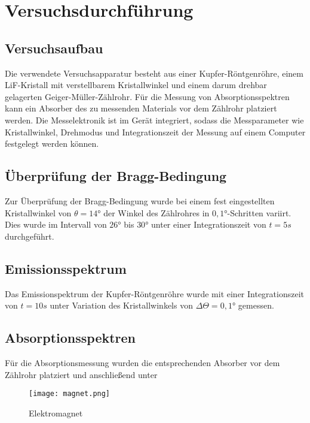 \section{Versuchsdurchführung}
\subsection{Versuchsaufbau}
Die verwendete Versuchsapparatur besteht aus einer Kupfer-Röntgenröhre, einem LiF-Kristall mit verstellbarem Kristallwinkel und einem darum drehbar gelagerten Geiger-Müller-Zählrohr. Für die Messung von Absorptionsspektren kann ein Absorber des zu messenden Materials vor dem Zählrohr platziert werden. Die Messelektronik ist im Gerät integriert, sodass die Messparameter wie Kristallwinkel, Drehmodus und Integrationszeit der Messung auf einem Computer festgelegt werden können.
\subsection{Überprüfung der Bragg-Bedingung}
Zur Überprüfung der Bragg-Bedingung wurde bei einem fest eingestellten Kristallwinkel von $\theta=14°$ der Winkel des Zählrohres in $0,1°$-Schritten variirt. Dies wurde im Intervall von $26°$ bis $30°$ unter einer Integrationszeit von $t=5s$ durchgeführt.
\subsection{Emissionsspektrum}
Das Emissionspektrum der Kupfer-Röntgenröhre wurde mit einer Integrationszeit von $t=10s$ unter Variation des Kristallwinkels von $\Delta \Theta=0,1°$ gemessen.
\subsection{Absorptionsspektren}
Für die Absorptionsmessung wurden die entsprechenden Absorber vor dem Zählrohr platziert und anschließend unter  
\begin{figure}
    \centering
    \texttt{[image: magnet.png]}
    \caption{Elektromagnet}
    \label{fig:emagnet}
  \end{figure}

  
